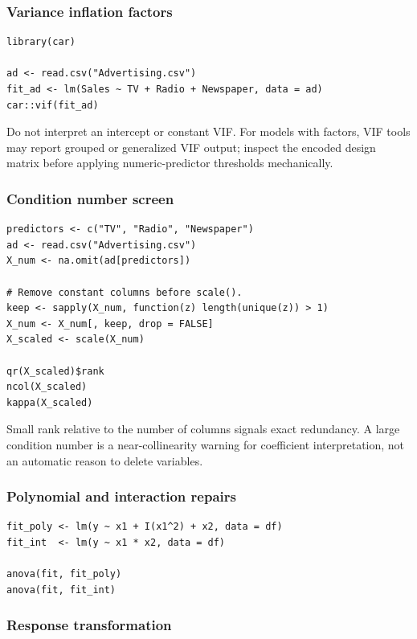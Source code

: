 \subsubsection*{Variance inflation factors}

\begin{verbatim}
library(car)

ad <- read.csv("Advertising.csv")
fit_ad <- lm(Sales ~ TV + Radio + Newspaper, data = ad)
car::vif(fit_ad)
\end{verbatim}

Do not interpret an intercept or constant VIF.  For models with factors, VIF tools may report grouped or generalized VIF output; inspect the encoded design matrix before applying numeric-predictor thresholds mechanically.

\subsubsection*{Condition number screen}

\begin{verbatim}
predictors <- c("TV", "Radio", "Newspaper")
ad <- read.csv("Advertising.csv")
X_num <- na.omit(ad[predictors])

# Remove constant columns before scale().
keep <- sapply(X_num, function(z) length(unique(z)) > 1)
X_num <- X_num[, keep, drop = FALSE]
X_scaled <- scale(X_num)

qr(X_scaled)$rank
ncol(X_scaled)
kappa(X_scaled)
\end{verbatim}

Small rank relative to the number of columns signals exact redundancy.  A large condition number is a near-collinearity warning for coefficient interpretation, not an automatic reason to delete variables.

\subsubsection*{Polynomial and interaction repairs}

\begin{verbatim}
fit_poly <- lm(y ~ x1 + I(x1^2) + x2, data = df)
fit_int  <- lm(y ~ x1 * x2, data = df)

anova(fit, fit_poly)
anova(fit, fit_int)
\end{verbatim}

\subsubsection*{Response transformation}

